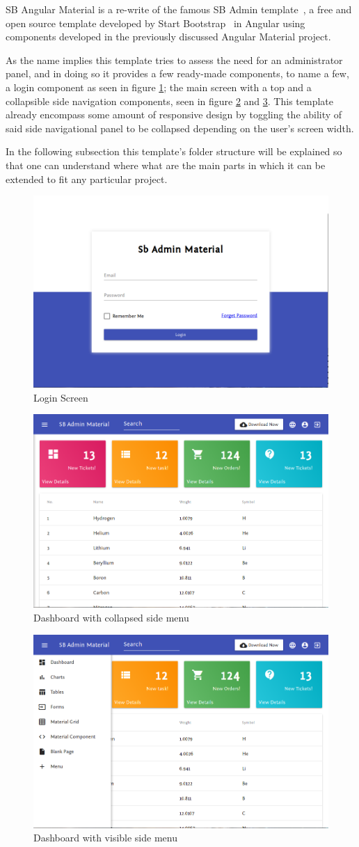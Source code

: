 SB Angular Material is a re-write of the famous SB Admin template~\cite{angulartemplate}, a free and open source template developed by Start Bootstrap~\cite{sbadmin} in Angular using components developed in the previously discussed Angular Material project.

As the name implies this template tries to assess the need for an administrator panel, and in doing so it provides a few ready-made components, to name a few, a login component as seen in figure \ref{fig:login}; the main screen with a top and a collapsible side navigation components, seen in figure \ref{fig:dash} and \ref{fig:visible}. This template already encompass some amount of responsive design by toggling the ability of said side navigational panel to be collapsed depending on the user's screen width.

In the following subsection this template's folder structure will be explained so that one can understand where what are the main parts in which it can be extended to fit any particular project.

\begin{figure}
  \centering
  \includegraphics[width=.5\textwidth]{images/sbadmin/login}
  \caption{Login Screen}
  \label{fig:login}
\end{figure}
\begin{figure}
  \centering
  \includegraphics[width=.5\textwidth]{images/sbadmin/collapsed}
  \caption{Dashboard with collapsed side menu}
  \label{fig:dash}
\end{figure}
\begin{figure}
  \centering
  \includegraphics[width=.5\textwidth]{images/sbadmin/visible}
  \caption{Dashboard with visible side menu}
  \label{fig:visible}
\end{figure}

